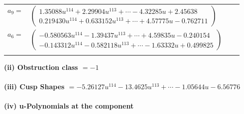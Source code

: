 \documentclass[1p]{elsarticle_modified}
\theoremstyle{definition}
\begin{document}
\begin{tabular}{m{7pt} m{180pt} m{7pt} m{180pt} }
\flushright $a_{9}=$&$\begin{pmatrix}1.35088 u^{114}+2.29904 u^{113}+\cdots-4.32285 u+2.45638\\0.219430 u^{114}+0.633152 u^{113}+\cdots+4.57775 u-0.762711\end{pmatrix}$ \\
\flushright $a_{6}=$&$\begin{pmatrix}-0.580563 u^{114}-1.39437 u^{113}+\cdots+4.59835 u-0.240154\\-0.143312 u^{114}-0.582118 u^{113}+\cdots-1.63332 u+0.499825\end{pmatrix}$\\&\end{tabular}
\flushleft \textbf{(ii) Obstruction class $= -1$}\\~\\
\flushleft \textbf{(iii) Cusp Shapes $= -5.26127 u^{114}-13.4625 u^{113}+\cdots-1.05644 u-6.56776$}\\~\\
\newpage\renewcommand{\arraystretch}{1}
\flushleft \textbf{(iv) u-Polynomials at the component}\newline \\
\end{document}
